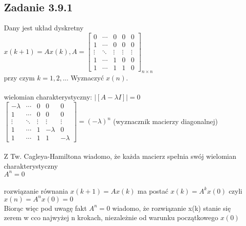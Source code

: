 \pagebreak
\subsection*{Zadanie 3.9.1} {\color{darkgray}
	Dany jest układ dyskretny\\
	$x(k+1)=Ax(k), A=\left[ \begin{array}{ccccc}    0&\cdots&0&0&0 \\  1&\cdots&0&0&0 \\\vdots&\ddots&\vdots&\vdots&\vdots \\ 1&\cdots&1&0&0    \\1&\cdots&1&1&0\end{array}\right]_{n \times n}$\\
	przy czym $k=1,2,...$ Wyznaczyć $x(n)$.
}\\\\
wielomian charakterystyczny: $| [A-\lambda I] |=0$\\
$\left[ \begin{array}{ccccc}    -\lambda&\cdots&0&0&0 \\  1&\cdots&0&0&0 \\\vdots&\ddots&\vdots&\vdots&\vdots \\ 1&\cdots&1&-\lambda&0    \\1&\cdots&1&1&-\lambda\end{array}\right]=(-\lambda)^n${\color{lightgray} (wyznacznik macierzy diagonalnej)}\\\\
Z Tw. Cagleya-Hamiltona wiadomo, że każda macierz spełnia swój wielomian charakterystyczny\\
$A^n=0 $\\\\
rozwiązanie równania $x(k+1)=Ax(k)$ ma postać $x(k)=A^kx(0)$ czyli $x(n)=A^nx(0)=0$\\
Biorąc więc pod uwagę fakt $A^n=0 $ wiadomo, że rozwiązanie x(k) stanie się zerem w cco najwyżej n krokach, niezależnie od warunku początkowego $x(0)$

\pagebreak
